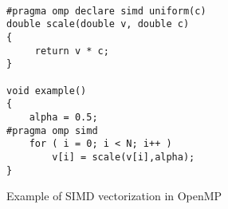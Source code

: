 \begin{figure}
\begin{lstlisting}

#pragma omp declare simd uniform(c)
double scale(double v, double c)
{
     return v * c;
}

void example()
{
    alpha = 0.5;
#pragma omp simd 
    for ( i = 0; i < N; i++ )
        v[i] = scale(v[i],alpha);
}

\end{lstlisting}
\caption{Example of SIMD vectorization in OpenMP}
\label{fig:simd-example}
\end{figure}

